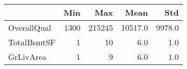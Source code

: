 \begin{tabular}{lrrrr}
\toprule
{} &   Min &     Max &     Mean &     Std \\
\midrule
OverallQual &  1300 &  215245 &  10517.0 &  9978.0 \\
TotalBsmtSF &     1 &      10 &      6.0 &     1.0 \\
GrLivArea   &     1 &       9 &      6.0 &     1.0 \\
\bottomrule
\end{tabular}
